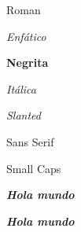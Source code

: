 \documentclass{book}
\begin{document}
{\rm Roman}

{\em Enfático}

{\bf Negrita}

{\it Itálica}

{\sl Slanted}

{\sf Sans Serif}

{\sc Small Caps}


{\it\bf Hola mundo}


\textbf{\textit{Hola mundo}}
\end{document}
